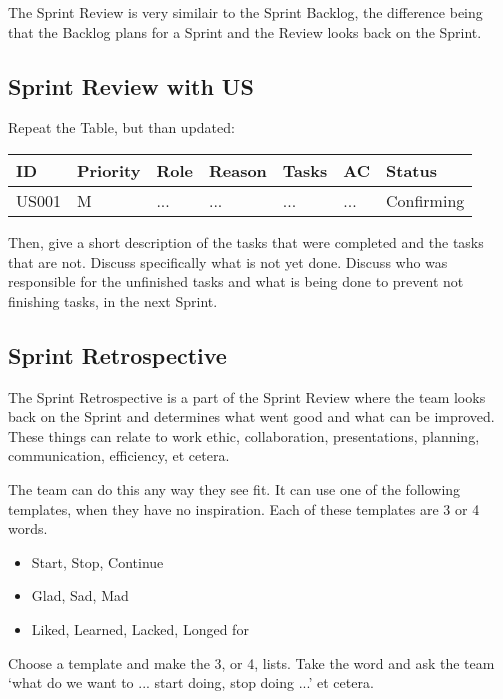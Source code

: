 \documentclass[10pt]{report}
\begin{document}
The Sprint Review is very similair to the Sprint Backlog, the difference being that the Backlog plans for a Sprint and the Review looks back on the Sprint.

\subsection{Sprint Review with US}

Repeat the Table, but than updated: 

\medskip
\begin{tabularx}{0.8\textwidth} { 
  | >{\raggedright\arraybackslash}X 
  | >{\centering\arraybackslash}X 
  | >{\raggedright\arraybackslash}X 
  | >{\raggedright\arraybackslash}X 
  | >{\raggedright\arraybackslash}X 
  | >{\raggedright\arraybackslash}X 
  | >{\raggedleft\arraybackslash}X | }
 \hline
 ID & Priority & Role & Reason & Tasks & AC & Status \\
 \hline
 US001 & M & ... & ... & ... & ... & Confirming \\
 \hline
\end{tabularx}
\medskip

Then, give a short description of the tasks that were completed and the tasks that are not. Discuss specifically what is not yet done. Discuss who was responsible for the unfinished tasks and what is being done to prevent not finishing tasks, in the next Sprint.

\subsection{Sprint Retrospective}

The Sprint Retrospective is a part of the Sprint Review where the team looks back on the Sprint and determines what went good and what can be improved. These things can relate to work ethic, collaboration, presentations, planning, communication, efficiency, et cetera.

The team can do this any way they see fit. It can use one of the following templates, when they have no inspiration. Each of these templates are 3 or 4 words.

\begin{itemize}
	\item Start, Stop, Continue
	\item Glad, Sad, Mad
	\item Liked, Learned, Lacked, Longed for
\end{itemize}

Choose a template and make the 3, or 4, lists. Take the word and ask the team `what do we want to ... start doing, stop doing ...' et cetera. 
\end{document}

